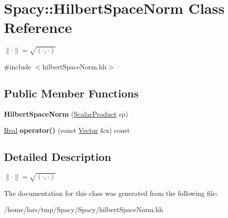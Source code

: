 \hypertarget{classSpacy_1_1HilbertSpaceNorm}{}\section{Spacy\+:\+:Hilbert\+Space\+Norm Class Reference}
\label{classSpacy_1_1HilbertSpaceNorm}


$ \|\cdot\|=\sqrt{(\cdot,\cdot)} $  




{\ttfamily \#include $<$hilbert\+Space\+Norm.\+hh$>$}

\subsection*{Public Member Functions}
\begin{DoxyCompactItemize}
\item 
{\bfseries Hilbert\+Space\+Norm} (\hyperlink{namespaceSpacy_aa995526aa0e3fa58aca8dd6772311cad}{Scalar\+Product} sp)\hypertarget{classSpacy_1_1HilbertSpaceNorm_aba5acc55249256d58fbba34911446ca2}{}\label{classSpacy_1_1HilbertSpaceNorm_aba5acc55249256d58fbba34911446ca2}

\item 
\hyperlink{classSpacy_1_1Real}{Real} {\bfseries operator()} (const \hyperlink{classSpacy_1_1Vector}{Vector} \&x) const \hypertarget{classSpacy_1_1HilbertSpaceNorm_a042d8b6148297e16c0244e50799967c5}{}\label{classSpacy_1_1HilbertSpaceNorm_a042d8b6148297e16c0244e50799967c5}

\end{DoxyCompactItemize}


\subsection{Detailed Description}
$ \|\cdot\|=\sqrt{(\cdot,\cdot)} $ 

The documentation for this class was generated from the following file\+:\begin{DoxyCompactItemize}
\item 
/home/lars/tmp/\+Spacy/\+Spacy/hilbert\+Space\+Norm.\+hh\end{DoxyCompactItemize}
